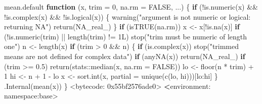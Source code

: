 \documentclass[
  10pt,
  a4paper]{book}
\newenvironment{Shaded}{\begin{snugshade}}{\end{snugshade}}
\newcommand{\AttributeTok}[1]{\textcolor[rgb]{0.77,0.63,0.00}{#1}}
\newcommand{\ConstantTok}[1]{\textcolor[rgb]{0.00,0.00,0.00}{#1}}
\newcommand{\ControlFlowTok}[1]{\textcolor[rgb]{0.13,0.29,0.53}{\textbf{#1}}}
\newcommand{\DecValTok}[1]{\textcolor[rgb]{0.00,0.00,0.81}{#1}}
\newcommand{\ErrorTok}[1]{\textcolor[rgb]{0.64,0.00,0.00}{\textbf{#1}}}
\newcommand{\FloatTok}[1]{\textcolor[rgb]{0.00,0.00,0.81}{#1}}
\newcommand{\FunctionTok}[1]{\textcolor[rgb]{0.00,0.00,0.00}{#1}}
\newcommand{\NormalTok}[1]{#1}
\newcommand{\OtherTok}[1]{\textcolor[rgb]{0.56,0.35,0.01}{#1}}
\newcommand{\SpecialCharTok}[1]{\textcolor[rgb]{0.00,0.00,0.00}{#1}}
\newcommand{\StringTok}[1]{\textcolor[rgb]{0.31,0.60,0.02}{#1}}
\begin{document}
\begin{Shaded}
\begin{Highlighting}[]
\NormalTok{mean.default}
\ControlFlowTok{function}\NormalTok{ (x, }\AttributeTok{trim =} \DecValTok{0}\NormalTok{, }\AttributeTok{na.rm =} \ConstantTok{FALSE}\NormalTok{, ...) }
\NormalTok{\{}
    \ControlFlowTok{if}\NormalTok{ (}\SpecialCharTok{!}\FunctionTok{is.numeric}\NormalTok{(x) }\SpecialCharTok{\&\&} \SpecialCharTok{!}\FunctionTok{is.complex}\NormalTok{(x) }\SpecialCharTok{\&\&} \SpecialCharTok{!}\FunctionTok{is.logical}\NormalTok{(x)) \{}
        \FunctionTok{warning}\NormalTok{(}\StringTok{"argument is not numeric or logical: returning NA"}\NormalTok{)}
        \FunctionTok{return}\NormalTok{(}\ConstantTok{NA\_real\_}\NormalTok{)}
\NormalTok{    \}}
    \ControlFlowTok{if}\NormalTok{ (}\FunctionTok{isTRUE}\NormalTok{(na.rm)) }
\NormalTok{        x }\OtherTok{\textless{}{-}}\NormalTok{ x[}\SpecialCharTok{!}\FunctionTok{is.na}\NormalTok{(x)]}
    \ControlFlowTok{if}\NormalTok{ (}\SpecialCharTok{!}\FunctionTok{is.numeric}\NormalTok{(trim) }\SpecialCharTok{||} \FunctionTok{length}\NormalTok{(trim) }\SpecialCharTok{!=}\NormalTok{ 1L) }
        \FunctionTok{stop}\NormalTok{(}\StringTok{"\textquotesingle{}trim\textquotesingle{} must be numeric of length one"}\NormalTok{)}
\NormalTok{    n }\OtherTok{\textless{}{-}} \FunctionTok{length}\NormalTok{(x)}
    \ControlFlowTok{if}\NormalTok{ (trim }\SpecialCharTok{\textgreater{}} \DecValTok{0} \SpecialCharTok{\&\&}\NormalTok{ n) \{}
        \ControlFlowTok{if}\NormalTok{ (}\FunctionTok{is.complex}\NormalTok{(x)) }
            \FunctionTok{stop}\NormalTok{(}\StringTok{"trimmed means are not defined for complex data"}\NormalTok{)}
        \ControlFlowTok{if}\NormalTok{ (}\FunctionTok{anyNA}\NormalTok{(x)) }
            \FunctionTok{return}\NormalTok{(}\ConstantTok{NA\_real\_}\NormalTok{)}
        \ControlFlowTok{if}\NormalTok{ (trim }\SpecialCharTok{\textgreater{}=} \FloatTok{0.5}\NormalTok{) }
            \FunctionTok{return}\NormalTok{(stats}\SpecialCharTok{::}\FunctionTok{median}\NormalTok{(x, }\AttributeTok{na.rm =} \ConstantTok{FALSE}\NormalTok{))}
\NormalTok{        lo }\OtherTok{\textless{}{-}} \FunctionTok{floor}\NormalTok{(n }\SpecialCharTok{*}\NormalTok{ trim) }\SpecialCharTok{+} \DecValTok{1}
\NormalTok{        hi }\OtherTok{\textless{}{-}}\NormalTok{ n }\SpecialCharTok{+} \DecValTok{1} \SpecialCharTok{{-}}\NormalTok{ lo}
\NormalTok{        x }\OtherTok{\textless{}{-}} \FunctionTok{sort.int}\NormalTok{(x, }\AttributeTok{partial =} \FunctionTok{unique}\NormalTok{(}\FunctionTok{c}\NormalTok{(lo, hi)))[lo}\SpecialCharTok{:}\NormalTok{hi]}
\NormalTok{    \}}
    \FunctionTok{.Internal}\NormalTok{(}\FunctionTok{mean}\NormalTok{(x))}
\NormalTok{\}}
\SpecialCharTok{\textless{}}\NormalTok{bytecode}\SpecialCharTok{:} \DecValTok{0x55bf2576ade0}\SpecialCharTok{\textgreater{}}
\ErrorTok{\textless{}}\NormalTok{environment}\SpecialCharTok{:}\NormalTok{ namespace}\SpecialCharTok{:}\NormalTok{base}\SpecialCharTok{\textgreater{}}
\end{Highlighting}
\end{Shaded}
\end{document}
